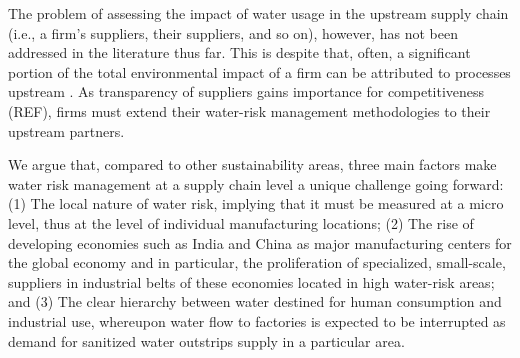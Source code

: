 \documentclass[a4paper]{article}
\begin{document}
The problem of assessing the impact of water usage in the upstream supply chain (i.e., a firm's suppliers, their suppliers, and so on), however, has not been addressed in the literature thus far. 
This is despite that, often, a significant portion of the total environmental impact of a firm can be attributed to processes upstream \citep{Pelton:2016}.
As transparency of suppliers gains importance for competitiveness (REF), firms must extend their water-risk management methodologies to their upstream partners.


We argue that, compared to other sustainability areas, three main factors make water risk management at a supply chain level a unique challenge going forward: (1) The local nature of water risk, implying that it must be measured at a micro level, thus at the level of individual manufacturing locations; (2) The  rise of developing economies such as India and China as major manufacturing centers for the global economy \citep{Friedman:2005} and in particular, the proliferation of specialized, small-scale, suppliers in industrial belts of these economies located in high water-risk areas; and (3) The clear hierarchy between water destined for human consumption and industrial use, whereupon water flow to factories is expected to be interrupted as demand for sanitized water outstrips supply in a particular area.    

\end{document}
